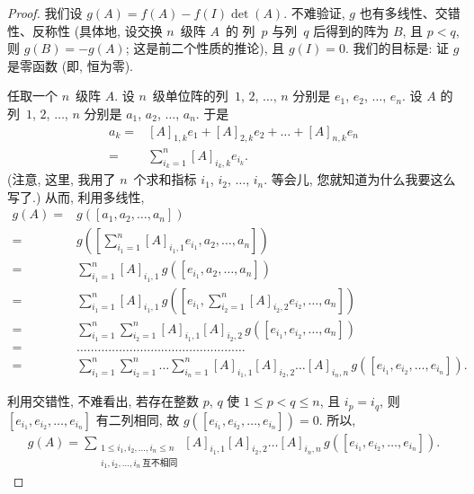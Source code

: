 \begin{proof}
    我们设 \(g(A) = f(A) - f(I) \det {(A)}\).
    不难验证, \(g\) 也有多线性、交错性、反称性
    (具体地, 设交换 \(n\)~级阵 \(A\)~的%
    列~\(p\) 与列~\(q\) 后得到的阵为 \(B\),
    且 \(p < q\),
    则 \(g(B) = -g(A)\);
    这是前二个性质的推论),
    且 \(g(I) = 0\).
    我们的目标是: 证 \(g\) 是零函数 (即, 恒为零).

    任取一个 \(n\)~级阵 \(A\).
    设 \(n\)~级单位阵的列~\(1\), \(2\), \(\dots\), \(n\)
    分别是 \(e_1\), \(e_2\), \(\dots\), \(e_n\).
    设 \(A\) 的列~\(1\), \(2\), \(\dots\), \(n\)
    分别是 \(a_1\), \(a_2\), \(\dots\), \(a_n\).
    于是
    \begin{align*}
        a_{k}
        = {} & [A]_{1,k} e_{1} + [A]_{2,k} e_{2}
        + \dots + [A]_{n,k} e_{n}
        \\
        = {} & \sum_{i_k = 1}^{n} {[A]_{i_k,k} e_{i_k}}.
    \end{align*}
    (注意, 这里, 我用了 \(n\)~个求和指标
    \(i_1\), \(i_2\), \(\dots\), \(i_n\).
    等会儿, 您就知道为什么我要这么写了.)
    从而, 利用多线性,
    \begin{align*}
        g(A)
        = {} &
        g([a_1, a_2, \dots, a_n])
        \\
        = {} &
        g\left(\left[ \sum_{i_1 = 1}^{n} {[A]_{i_1,1} e_{i_1},
        a_2, \dots, a_n} \right]\right)
        \\
        = {} &
        \sum_{i_1 = 1}^{n} {[A]_{i_1,1}\,
        g([ e_{i_1}, a_2, \dots, a_n ])}
        \\
        = {} &
        \sum_{i_1 = 1}^{n} {[A]_{i_1,1}\,
        g\left(\left[ e_{i_1},
            \sum_{i_2 = 1}^{n} [A]_{i_2,2} e_{i_2},
        \dots, a_n
        \right]\right)}
        \\
        = {} &
        \sum_{i_1 = 1}^{n} {
        \sum_{i_2 = 1}^{n} {[A]_{i_1,1} [A]_{i_2,2}\,
        g([ e_{i_1}, e_{i_2}, \dots, a_n ])}}
        \\
        = {} &
        \dots \dots \dots \dots
        \dots \dots \dots \dots
        \dots \dots \dots \dots
        \dots \dots \dots \dots
        \\
        = {} &
        \sum_{i_1 = 1}^{n} {
        \sum_{i_2 = 1}^{n} {
        \dots
        \sum_{i_n = 1}^{n} {
        [A]_{i_1,1} [A]_{i_2,2} \dots [A]_{i_n,n} \,
        g([e_{i_1}, e_{i_2}, \dots, e_{i_n}])}}}.
    \end{align*}

    利用交错性, 不难看出,
    若存在整数 \(p\), \(q\)
    使 \(1 \leq p < q \leq n\),
    且 \(i_p = i_q\),
    则 \([e_{i_1}, e_{i_2}, \dots, e_{i_n}]\)
    有二列相同,
    故 \(g([e_{i_1}, e_{i_2}, \dots, e_{i_n}]) = 0\).
    所以,
    \begin{align*}
        g(A)
        = \sum_{\substack{
        1 \leq i_1, i_2, \dots, i_n \leq n \\
                i_1, i_2, \dots, i_n\,\text{互不相同}
            }}
        {[A]_{i_1,1} [A]_{i_2,2} \dots [A]_{i_n,n}\,
            g([e_{i_1}, e_{i_2}, \dots, e_{i_n}])}.
    \end{align*}


\end{proof}
